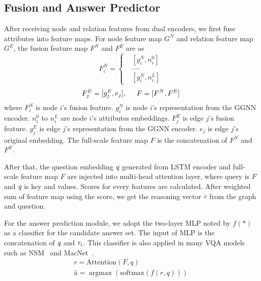 \documentclass[letterpaper]{article} %
\begin{document}
\subsection{Fusion and Answer Predictor}
After receiving node and relation features from dual encoders, we first fuse attributes into feature maps. For node feature map $G^N$ and relation feature map $G^E$, the fusion feature map $F^N$ and $F^E$ are as
$$ F_i^N =\left\{
    \begin{aligned}
    &[g_i^N, n_i^0]\\
    &....\\
    &[g_i^N, n_i^L]
    \end{aligned}
\right.
$$
\begin{gather}
    F_j^E = [g_j^E, e_j], \hspace{0.2in}
    F = [F^N, F^E]
\end{gather}
where $F_i^N$ is node $i$'s fusion feature. $g_i^N$ is node $i$'s representation from the GGNN encoder. $n_i^0$ to $n_i^L$ are node $i$'s attributes embeddings. $F_j^E$ is edge $j$'s fusion feature. $g_j^E$ is edge $j$'s representation from the GGNN encoder. $e_j$ is edge $j$'s original embedding. The full-scale feature map $F$ is the concatenation of $F^N$ and $F^E$.

After that, the question embedding $\emph{q}$ generated from LSTM encoder and full-scale feature map $F$ are injected into multi-head attention layer, where query is $F$ and $\emph{q}$ is key and values. Scores for every features are calculated. After weighted sum of feature map using the score, we get the reasoning vector $\emph{r}$ from the graph and question.

For the answer prediction module, we adopt the two-layer MLP noted by $f(*)$ as a classifier for the candidate answer set. The input of MLP is the concatenation of $\emph{q}$ and $\emph{r}_i$. This classifier is also applied in many VQA models such as NSM~\cite{DBLP:conf/nips/HudsonM19} and MacNet~\cite{DBLP:conf/nips/LuYBP16}.
\begin{gather}
    r = \text{Attention}(F, q)\\
    \hat{a} = \mathop{\arg\max}(\text{softmax}(f(r, q)))
\end{gather}
\end{document}
